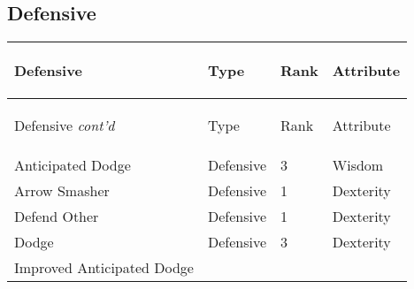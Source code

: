 \documentclass[twoside]{book}
\begin{document}
\hspace{-2ex}

\vspace{1ex}
    
    

\subsection{Defensive}
    
\begin{longtable}{p{1.25in}lll} 
  Defensive
  &
  \begin{turn}{70}{Type}\end{turn}
          
  &
  \begin{turn}{70}{Rank}\end{turn}
          
  &
  \begin{turn}{70}{Attribute}\end{turn}
          
  \\
  \hline
  \hline
  \endfirsthead
  Defensive \textit{cont'd}
        
  &
  \begin{turn}{70}{Type}\end{turn}
          
  &
  \begin{turn}{70}{Rank}\end{turn}
          
  &
  \begin{turn}{70}{Attribute}\end{turn}
          
  \\
  \endhead
      
  \raggedright
           Anticipated Dodge 
  &
   Defensive 
  &
   3 
  &
   Wisdom 
  \tabularnewline
  \hline
      
  \raggedright
           Arrow Smasher 
  &
   Defensive 
  &
   1 
  &
   Dexterity 
  \tabularnewline
  \hline
      
  \raggedright
           Defend Other 
  &
   Defensive 
  &
   1 
  &
   Dexterity 
  \tabularnewline
  \hline
      
  \raggedright
           Dodge 
  &
   Defensive 
  &
   3 
  &
   Dexterity 
  \tabularnewline
  \hline
      
  \raggedright
           Improved Anticipated Dodge
           

\end{longtable}
\end{document}
